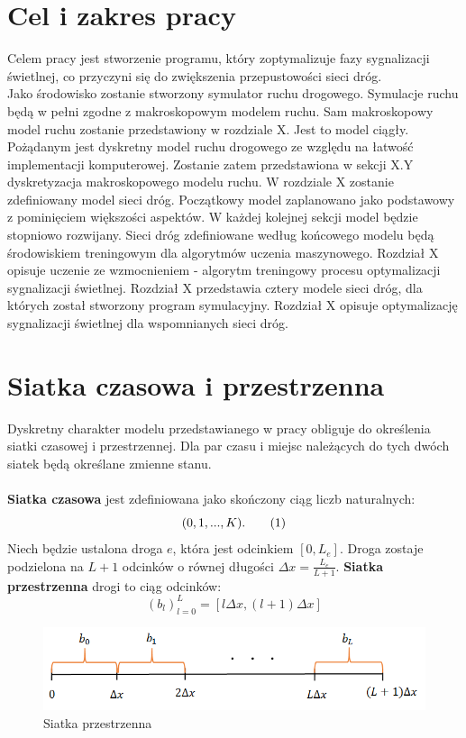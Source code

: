 \documentclass[12pt]{book}
\theoremstyle{plain}
\newcommand\addtag{\refstepcounter{equation}
\renewcommand{\labelenumii}{\theenumii}
\renewcommand{\theenumii}{\theenumi.\arabic{enumii}.}
\tag{\theequation}}
\begin{document}
\chapter{Cel i zakres pracy}
Celem pracy jest stworzenie programu, który zoptymalizuje fazy sygnalizacji świetlnej, co przyczyni się do zwiększenia przepustowości sieci dróg.\\ Jako środowisko zostanie stworzony symulator ruchu drogowego. Symulacje ruchu będą w pełni zgodne z makroskopowym modelem ruchu. Sam makroskopowy model ruchu zostanie przedstawiony w rozdziale X. Jest to model ciągły. Pożądanym jest dyskretny model ruchu drogowego ze względu na łatwość implementacji komputerowej. Zostanie zatem przedstawiona w sekcji X.Y dyskretyzacja makroskopowego modelu ruchu. W rozdziale X zostanie zdefiniowany model sieci dróg. Początkowy model zaplanowano jako podstawowy z pominięciem większości aspektów. W każdej kolejnej sekcji model będzie stopniowo rozwijany. Sieci dróg zdefiniowane według końcowego modelu będą środowiskiem treningowym dla algorytmów uczenia maszynowego. Rozdział X opisuje uczenie ze wzmocnieniem - algorytm treningowy procesu optymalizacji sygnalizacji świetlnej. Rozdział X przedstawia cztery modele sieci dróg, dla których został stworzony program symulacyjny. Rozdział X opisuje optymalizację sygnalizacji świetlnej dla wspomnianych sieci dróg.


   
\chapter{Siatka czasowa i przestrzenna}
Dyskretny charakter modelu przedstawianego w pracy obliguje do określenia siatki czasowej i przestrzennej. Dla par czasu i miejsc należących do tych dwóch siatek będą określane zmienne stanu. \\ \\ \textbf{Siatka czasowa} jest zdefiniowana jako skończony ciąg liczb naturalnych:
\[(0,1,...,K). \addtag \]
Niech będzie ustalona droga $e$, która jest odcinkiem $[0,L_e]$. Droga zostaje podzielona na $L+1$ odcinków o równej długości $\Delta x=\frac{L_e}{L+1}$. \textbf{Siatka przestrzenna} drogi to ciąg odcinków:
\[(b_l)_{l=0}^{L}=[l\Delta x,(l+1)\Delta x]\]
\begin{figure}[H]
  \centering
    \includegraphics[width=14cm]{siatka_przestrzenna}
 \caption{Siatka przestrzenna}
 \label{fig:siatka_przestrzenna}
\end{figure}
\end{document}
